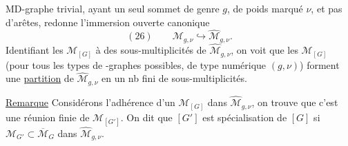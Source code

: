 MD-graphe trivial, ayant un seul sommet de genre $g$, de poids marqué $\nu$, et pas d'arêtes, redonne l'immersion ouverte canonique
\[
(26)\qquad\mathcal M_{g,\nu}\hookrightarrow\widehat{\mathcal M}_{g,\nu}.
\]
Identifiant les $\mathcal M_{[G]}$ à des sous-multiplicités de $\widehat{\mathcal M}_{g,\nu}$, on voit que les $\mathcal M_{[G]}$ (pour tous les types de -graphes possibles, de type numérique $(g,\nu)$) forment une \uline{partition} de $\widehat{\mathcal M}_{g,\nu}$ en un nb fini de sous-multiplicités.

\uline{Remarque} Considérons l'adhérence d'un $\mathcal M_{[G]}$ dans $\widehat{\mathcal M}_{g,\nu}$, on trouve que c'est une réunion finie de $\mathcal M_{[G']}$. On dit que $[G']$ est spécialisation de $[G]$ si $\mathcal M_{G'}\subset\overline{\mathcal M}_G$ dans $\widehat{\mathcal M}_{g,\nu}$.
